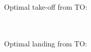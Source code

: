 \documentclass[aspectratio=169]{beamer}
\begin{document}
\begin{frame}
	\begin{multicols}{2}
		\hphantom{e}\\
		Optimal take-off from TO:
		\vfill\null
		\columnbreak
		\hphantom{e}\\
		\phantom{Optimal landing from TO:}
		
		\begin{figure}
			\centering
		\end{figure}
	\end{multicols}
\end{frame}

\begin{frame}
	\begin{multicols}{2}
		\hphantom{e}\\
		\phantom{Optimal take-off from TO:}
		\vfill\null
		\columnbreak
		\hphantom{e}\\
		Optimal landing from TO:
		
		\begin{figure}
			\centering
		\end{figure}
	\end{multicols}
\end{frame}
\end{document}
